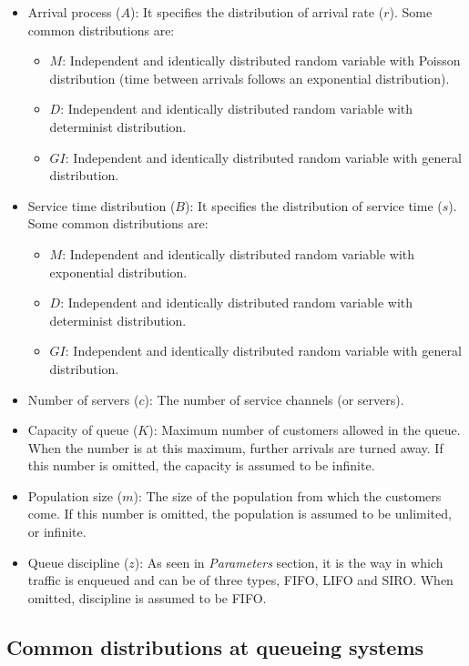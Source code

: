 \documentclass[../main.tex]{subfiles}
\begin{document}
\begin{itemize}
	\item {
		Arrival process ($A$): It specifies the distribution of arrival rate ($r$). Some common distributions are:
		\begin{itemize}
			\item $M$: Independent and identically distributed random variable with Poisson distribution (time between arrivals follows an exponential distribution).
			\item $D$: Independent and identically distributed random variable with determinist distribution.
			\item $GI$: Independent and identically distributed random variable with general distribution.
		\end{itemize}
	}
	\item {
		Service time distribution ($B$): It specifies the distribution of service time ($s$). Some common distributions are:
		\begin{itemize}
			\item $M$: Independent and identically distributed random variable with exponential distribution.
			\item $D$: Independent and identically distributed random variable with determinist distribution.
			\item $GI$: Independent and identically distributed random variable with general distribution.
		\end{itemize}
	}
	\item Number of servers ($c$): The number of service channels (or servers).
	\item Capacity of queue ($K$): Maximum number of customers allowed in the queue. When the number is at this maximum, further arrivals are turned away. If this number is omitted, the capacity is assumed to be infinite.
	\item Population size ($m$): The size of the population from which the customers come. If this number is omitted, the population is assumed to be unlimited, or infinite.
	\item Queue discipline ($z$): As seen in \textit{Parameters} section, it is the way in which traffic is enqueued and can be of three types, FIFO, LIFO and SIRO. When omitted, discipline is assumed to be FIFO.
\end{itemize}

\subsection{Common distributions at queueing systems}
\end{document}
